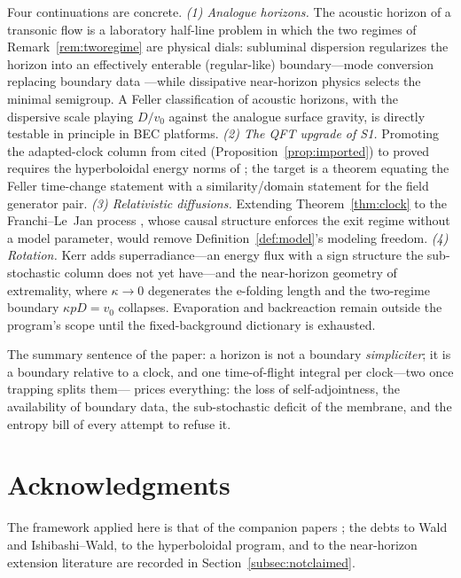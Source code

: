 \documentclass[11pt]{article}
\theoremstyle{definition}
\theoremstyle{remark}
\begin{document}
Four continuations are concrete. \emph{(1) Analogue horizons.} The
acoustic horizon of a transonic flow \cite{Unruh1981,BLV2005} is a
laboratory half-line problem in which the two regimes of
Remark~\ref{rem:tworegime} are physical dials: subluminal dispersion
regularizes the horizon into an effectively enterable (regular-like)
boundary---mode conversion replacing boundary data
\cite{CoutantParentani2012}---while dissipative near-horizon physics
selects the minimal semigroup. A Feller classification of acoustic
horizons, with the dispersive scale playing $D/v_{0}$ against the
analogue surface gravity, is directly testable in principle in BEC
platforms. \emph{(2) The QFT upgrade of S1.} Promoting the
adapted-clock column from cited (Proposition~\ref{prop:imported}) to
proved requires the hyperboloidal energy norms of
\cite{Warnick2015,Jaramillo2021}; the target is a theorem equating
the Feller time-change statement with a similarity/domain statement
for the field generator pair. \emph{(3) Relativistic diffusions.}
Extending Theorem~\ref{thm:clock} to the Franchi--Le~Jan process
\cite{FranchiLeJan2007}, whose causal structure enforces the exit
regime without a model parameter, would remove
Definition~\ref{def:model}'s modeling freedom. \emph{(4) Rotation.}
Kerr adds superradiance---an energy flux with a sign structure the
sub-stochastic column does not yet have---and the near-horizon
geometry of extremality, where $\kappa\to0$ degenerates the
e-folding length and the two-regime boundary
$\kappa pD=v_{0}$ collapses. Evaporation and backreaction remain
outside the program's scope until the fixed-background dictionary is
exhausted.

The summary sentence of the paper: a horizon is not a boundary
\emph{simpliciter}; it is a boundary relative to a clock, and one
time-of-flight integral per clock---two once trapping splits them---
prices everything: the loss of self-adjointness, the availability of
boundary data, the sub-stochastic deficit of the membrane, and the
entropy bill of every attempt to refuse it.

\section*{Acknowledgments}
The framework applied here is that of the companion papers
\cite{indivisible,instantaneous}; the debts to Wald and
Ishibashi--Wald, to the hyperboloidal program, and to the
near-horizon extension literature are recorded in
Section~\ref{subsec:notclaimed}.
\end{document}
